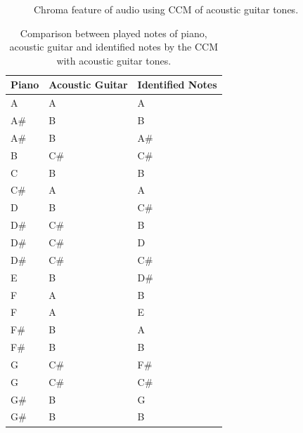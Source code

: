 \documentclass{article}
\begin{document}
	\begin{figure}[h]
	 \centerline{}
	 \caption{Chroma feature of audio using CCM of acoustic guitar tones.}
	 \label{fig:2-ccm-violao}
	\end{figure}	


	\begin{table}[h]
	 \begin{center}
	 \begin{tabular}{|l|l|l|}
	  \hline
	  Piano & Acoustic Guitar & Identified Notes \\
	  \hline
			  A & A &  A \\
		A\# &  B &  B \\
		    A\# &  B &    A\# \\
		    B  &   C\# &  C\# \\
		    C   &  B  &   B \\
		    C\# &  A   &  A \\
		    D   &  B   &  C\# \\
		    D\# &  C\# &  B \\
		    D\# &  C\# &  D \\
		    D\# &  C\# &  C\# \\
		    E   &  B  &   D\# \\
		    F   &  A   &  B \\
		    F   &  A  &   E \\
		    F\# &  B  &   A \\
		    F\# &  B   &  B \\
		    G   &  C\# &  F\# \\
		    G   &  C\# &  C\# \\
		    G\# &  B   &  G \\
		    G\# &  B  &   B \\
	  \hline
	 \end{tabular}
	\end{center}
	 \caption{Comparison between played notes of piano, acoustic guitar and identified notes by the CCM with acoustic guitar tones.}
	 \label{tab:table-2-ccm-violao}
	\end{table}
\end{document}
